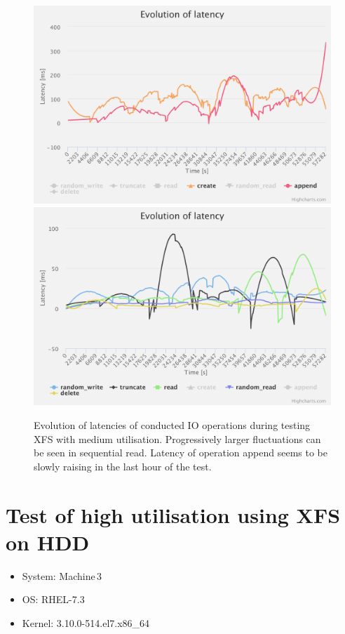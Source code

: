 \documentclass[
  color, %
  table, %
  lof,   %
  lot,   %
]{fithesis3}
\begin{document}
\begin{figure}[!htb]
    \centering
   \begin{minipage}{\textwidth}
        \centering
        \includegraphics[width=\textwidth]{../charts/HDD_xfs/low_ca}
        \includegraphics[width=\textwidth]{../charts/HDD_xfs/low_others}
        \caption[Evolution of latencies of XFS during testing of medium utilisation of HDD]{Evolution of latencies of conducted IO operations during testing XFS with medium utilisation. Progressively larger fluctuations can be seen in sequential read. Latency of operation append seems to be slowly raising in the last hour of the test.}
\label{fig:lats80_xfs}
    \end{minipage}
\end{figure}

\clearpage

\section{Test of high utilisation using XFS on HDD}
\begin{itemize}
\itemsep0em 
   \item System: Machine\,3
   \item OS: RHEL-7.3
   \item Kernel: 3.10.0-514.el7.x86\_64
\end{itemize}
\end{document}
